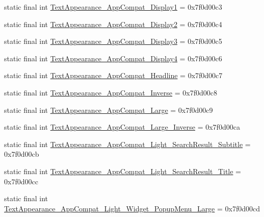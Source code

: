 \begin{DoxyCompactItemize}
\item 
static final int \mbox{\hyperlink{classandroid_1_1support_1_1design_1_1_r_1_1style_a3d7fcc642e94e5d0da4cc0eb050d4377}{Text\+Appearance\+\_\+\+App\+Compat\+\_\+\+Display1}} = 0x7f0d00c3
\item 
static final int \mbox{\hyperlink{classandroid_1_1support_1_1design_1_1_r_1_1style_a5119c9d4d6b9119f974c3cc3d3274622}{Text\+Appearance\+\_\+\+App\+Compat\+\_\+\+Display2}} = 0x7f0d00c4
\item 
static final int \mbox{\hyperlink{classandroid_1_1support_1_1design_1_1_r_1_1style_afcc42ebd522f07fcc0fd82c0b6c8ec54}{Text\+Appearance\+\_\+\+App\+Compat\+\_\+\+Display3}} = 0x7f0d00c5
\item 
static final int \mbox{\hyperlink{classandroid_1_1support_1_1design_1_1_r_1_1style_a9b9f3be8cc0db80bccd10e2d09001c13}{Text\+Appearance\+\_\+\+App\+Compat\+\_\+\+Display4}} = 0x7f0d00c6
\item 
static final int \mbox{\hyperlink{classandroid_1_1support_1_1design_1_1_r_1_1style_a8d4490bb630d7ae6f24ef8a91885d63e}{Text\+Appearance\+\_\+\+App\+Compat\+\_\+\+Headline}} = 0x7f0d00c7
\item 
static final int \mbox{\hyperlink{classandroid_1_1support_1_1design_1_1_r_1_1style_acc2c875b4af6beac9360f42572c25d9a}{Text\+Appearance\+\_\+\+App\+Compat\+\_\+\+Inverse}} = 0x7f0d00c8
\item 
static final int \mbox{\hyperlink{classandroid_1_1support_1_1design_1_1_r_1_1style_ad3d980817c920614b02aac4354be82e7}{Text\+Appearance\+\_\+\+App\+Compat\+\_\+\+Large}} = 0x7f0d00c9
\item 
static final int \mbox{\hyperlink{classandroid_1_1support_1_1design_1_1_r_1_1style_a12013c3ce690759654e8b1a05327e0c9}{Text\+Appearance\+\_\+\+App\+Compat\+\_\+\+Large\+\_\+\+Inverse}} = 0x7f0d00ca
\item 
static final int \mbox{\hyperlink{classandroid_1_1support_1_1design_1_1_r_1_1style_ab6a60e6b39b2f6c94adbf6523ca0ddf7}{Text\+Appearance\+\_\+\+App\+Compat\+\_\+\+Light\+\_\+\+Search\+Result\+\_\+\+Subtitle}} = 0x7f0d00cb
\item 
static final int \mbox{\hyperlink{classandroid_1_1support_1_1design_1_1_r_1_1style_ad43f8905df9054ea1c5ee01caaa9aae2}{Text\+Appearance\+\_\+\+App\+Compat\+\_\+\+Light\+\_\+\+Search\+Result\+\_\+\+Title}} = 0x7f0d00cc
\item 
static final int \mbox{\hyperlink{classandroid_1_1support_1_1design_1_1_r_1_1style_a0ab8d102e79fb4df376280670f497119}{Text\+Appearance\+\_\+\+App\+Compat\+\_\+\+Light\+\_\+\+Widget\+\_\+\+Popup\+Menu\+\_\+\+Large}} = 0x7f0d00cd

\end{DoxyCompactItemize}
